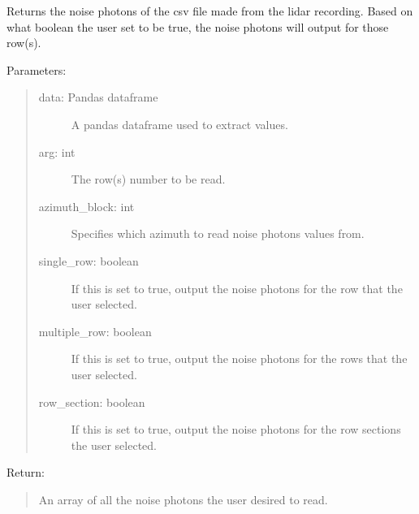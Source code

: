 \documentclass[letterpaper,10pt,english]{sphinxmanual}
\begin{document}
\begin{fulllineitems}
\label{\detokenize{Lidar extraction tool:lidar_extract.get_noise_photons}}
Returns the noise photons of the csv file made from the lidar recording. Based on what boolean the user set to be true,
the noise photons will output for those row(s).

Parameters:
\begin{quote}
\begin{description}
\item[{data: Pandas dataframe}] \leavevmode
A pandas dataframe used to extract values.

\item[{arg: int}] \leavevmode
The row(s) number to be read.

\item[{azimuth\_block: int}] \leavevmode
Specifies which azimuth to read noise photons values from.

\item[{single\_row: boolean}] \leavevmode
If this is set to true, output the noise photons for the row that the user selected.

\item[{multiple\_row: boolean}] \leavevmode
If this is set to true, output the noise photons for the rows that the user selected.

\item[{row\_section: boolean}] \leavevmode
If this is set to true, output the noise photons for the row sections the user selected.

\end{description}
\end{quote}

Return:
\begin{quote}

An array of all the noise photons the user desired to read.
\end{quote}

\end{fulllineitems}

\end{document}
